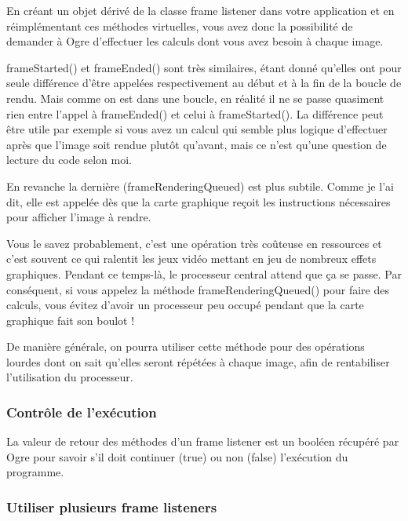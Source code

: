 En cr\'eant un objet d\'eriv\'e de la classe frame listener dans votre application et en r\'eimpl\'ementant ces m\'ethodes virtuelles, vous avez donc la possibilit\'e de demander \`{a} Ogre d'effectuer les calculs dont vous avez besoin \`{a} chaque image.



frameStarted() et frameEnded() sont tr\`es similaires, \'etant donn\'e qu'elles ont pour seule diff\'erence d'\^etre appel\'ees respectivement au d\'ebut et \`{a} la fin de la boucle de rendu. Mais comme on est dans une boucle, en r\'ealit\'e il ne se passe quasiment rien entre l'appel \`{a} frameEnded() et celui \`{a} frameStarted(). La diff\'erence peut \^etre utile par exemple si vous avez un calcul qui semble plus logique d'effectuer apr\`es que l'image soit rendue plut\^ot qu'avant, mais ce n'est qu'une question de lecture du code selon moi.


En revanche la derni\`ere (frameRenderingQueued) est plus subtile. Comme je l'ai dit, elle est appel\'ee d\`es que la carte graphique re\c{c}oit les instructions n\'ecessaires pour afficher l'image \`{a} rendre.


Vous le savez probablement, c'est une op\'eration tr\`es co\^uteuse en ressources et c'est souvent ce qui ralentit les jeux vid\'eo mettant en jeu de nombreux effets graphiques. Pendant ce temps-l\`{a}, le processeur central attend que \c{c}a se passe. Par cons\'equent, si vous appelez la m\'ethode frameRenderingQueued() pour faire des calculs, vous \'evitez d'avoir un processeur peu occup\'e pendant que la carte graphique fait son boulot !

De mani\`ere g\'en\'erale, on pourra utiliser cette m\'ethode pour des op\'erations lourdes dont on sait qu'elles seront r\'ep\'et\'ees \`{a} chaque image, afin de rentabiliser l'utilisation du processeur.




\subsubsection{Contr\^ole de l'ex\'ecution}

La valeur de retour des m\'ethodes d'un frame listener est un bool\'een r\'ecup\'er\'e par Ogre pour savoir s'il doit continuer (true) ou non (false) l'ex\'ecution du programme.



\subsubsection{Utiliser plusieurs frame listeners}

